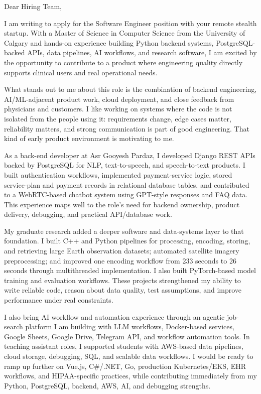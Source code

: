 \documentclass[11pt]{letter}
\begin{document}
\begin{letter}{}

\opening{Dear Hiring Team,}

I am writing to apply for the Software Engineer position with your remote stealth startup. With a Master of Science in Computer Science from the University of Calgary and hands-on experience building Python backend systems, PostgreSQL-backed APIs, data pipelines, AI workflows, and research software, I am excited by the opportunity to contribute to a product where engineering quality directly supports clinical users and real operational needs.

What stands out to me about this role is the combination of backend engineering, AI/ML-adjacent product work, cloud deployment, and close feedback from physicians and customers. I like working on systems where the code is not isolated from the people using it: requirements change, edge cases matter, reliability matters, and strong communication is part of good engineering. That kind of early product environment is motivating to me.

As a back-end developer at Asr Gooyesh Pardaz, I developed Django REST APIs backed by PostgreSQL for NLP, text-to-speech, and speech-to-text products. I built authentication workflows, implemented payment-service logic, stored service-plan and payment records in relational database tables, and contributed to a WebRTC-based chatbot system using GPT-style responses and FAQ data. This experience maps well to the role's need for backend ownership, product delivery, debugging, and practical API/database work.

My graduate research added a deeper software and data-systems layer to that foundation. I built C++ and Python pipelines for processing, encoding, storing, and retrieving large Earth observation datasets; automated satellite imagery preprocessing; and improved one encoding workflow from 233 seconds to 26 seconds through multithreaded implementation. I also built PyTorch-based model training and evaluation workflows. These projects strengthened my ability to write reliable code, reason about data quality, test assumptions, and improve performance under real constraints.

I also bring AI workflow and automation experience through an agentic job-search platform I am building with LLM workflows, Docker-based services, Google Sheets, Google Drive, Telegram API, and workflow automation tools. In teaching assistant roles, I supported students with AWS-based data pipelines, cloud storage, debugging, SQL, and scalable data workflows. I would be ready to ramp up further on Vue.js, C\#/.NET, Go, production Kubernetes/EKS, EHR workflows, and HIPAA-specific practices, while contributing immediately from my Python, PostgreSQL, backend, AWS, AI, and debugging strengths.


\end{letter}
\end{document}
